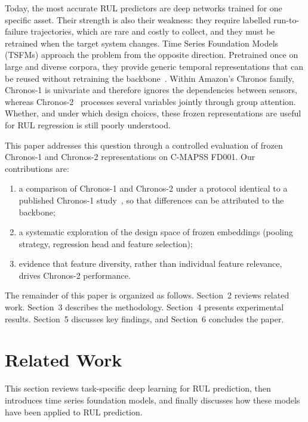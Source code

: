 \documentclass{svproc}
\begin{document}
Today, the most accurate RUL predictors are deep networks trained for one
specific asset. Their strength is also their weakness: they require
labelled run-to-failure trajectories, which are rare and costly to
collect, and they must be retrained when the target system changes. Time
Series Foundation Models (TSFMs) approach the problem from the opposite
direction. Pretrained once on large and diverse corpora, they provide
generic temporal representations that can be reused without retraining
the backbone~\cite{chronos2024}. Within Amazon's Chronos family, Chronos-1 is univariate and therefore ignores the
dependencies between sensors, whereas Chronos-2~\cite{chronos2_2025}
processes several variables jointly through group attention. Whether, and
under which design choices, these frozen representations are useful for
RUL regression is still poorly understood.

This paper addresses this question through a controlled evaluation of
frozen Chronos-1 and Chronos-2 representations on C-MAPSS FD001. Our
contributions are:
\begin{enumerate}
\item a comparison of Chronos-1 and Chronos-2 under a protocol identical
  to a published Chronos-1 study~\cite{imsa2025}, so that differences can
  be attributed to the backbone;
\item a systematic exploration of the design space of frozen embeddings
  (pooling strategy, regression head and feature selection);
\item evidence that feature diversity, rather than individual feature
  relevance, drives Chronos-2 performance.
\end{enumerate}

The remainder of this paper is organized as follows. Section~2 reviews
related work. Section~3 describes the methodology. Section~4 presents
experimental results. Section~5 discusses key findings, and Section~6
concludes the paper.

\section{Related Work}

This section reviews task-specific deep learning for RUL prediction, then
introduces time series foundation models, and finally discusses how
these models have been applied to RUL prediction.
\end{document}
